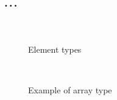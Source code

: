 \documentclass[10pt,journal,compsoc]{joser1}
\begin{document}
\section{$\ldots$}
\begin{figure}[htbp]
   \begin{center}
     \\
     \caption{Element types\label{fig:types}}
   \end{center}
\end{figure}

\begin{figure}[htbp]
   \begin{center}
     \\
     \caption{Example of array type\label{fig:image}}
   \end{center}
\end{figure}
\end{document}
